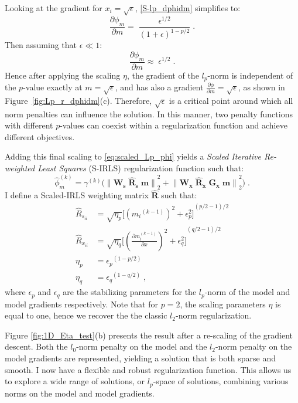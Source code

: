 Looking at the gradient for $x_i=\sqrt{\epsilon}$, \ref{S-lp_dphidm} simplifies to:
\begin{equation*}
\frac{\partial \phi_m}{\partial m} = \;\frac{\epsilon^{1/2}}{{(1+ \epsilon )}^{1-p/2}} \;.
\end{equation*}
Then assuming that $\epsilon \ll 1$:
\begin{equation} \label{approx_lp}
\frac{\partial \phi_m}{\partial m}\approx \; \epsilon^{1/2} \;.
\end{equation}
Hence after applying the scaling $\eta$, the gradient of the $l_p$-norm is independent of the $p$-value exactly at $m=\sqrt{\epsilon}$, and has also a gradient $\frac{\partial \phi}{\partial m}=\sqrt{\epsilon}$, as shown in Figure~\ref{fig:Lp_r_dphidm}(c).
Therefore, $\sqrt{\epsilon}$ is a critical point around which all norm penalties can influence the solution.
In this manner, two penalty functions with different $p$-values can coexist within a regularization function and achieve different objectives.
 
 Adding this final scaling to \ref{eq:scaled_Lp_phi} yields a \emph{Scaled Iterative Re-weighted Least Squares} (S-IRLS) regularization function such that: 
\begin{equation} \label{eq:S-IRLS}
\hat \phi_m^{(k)} = \gamma^{(k)} \Big ( {\| \mathbf{W_\text{s} \; \hat R_\text{s} \; m}\|}^2_2 +  {\|  \mathbf{ W_\text{x}\; \hat R_\text{x} \; G_\text{x} \; m}\|}^2_2  \Big ) \;.
 \end{equation}
I define a Scaled-IRLS weighting matrix $\mathbf{\hat R}$ such that:
\begin{equation} \label{eq:eta}
\begin{split}
{\hat R}_{s_{ii}}  &= \sqrt{\eta_p}{\Big[ {({m_i}^{(k-1)})}^{2} + \epsilon_p^2 \Big]}^{(p/2 - 1)/2} \\
{\hat R}_{x_{ii}}  &= \sqrt{\eta_q}{\Big[ {\left ({\frac{\partial m_i^{(k-1)} }{\partial x}}\right)}^{2} + \epsilon_q^2 \Big]}^{(q/2 - 1)/2}  \\
\eta_p &=  {\epsilon_p}^{(1-p/2)} \\
\eta_q &=   {\epsilon_q}^{(1-q/2)}  \;, 
\end{split}
\end{equation}
where $\epsilon_p$ and $\epsilon_q$ are the stabilizing parameters for the $l_p$-norm of the model and model gradients respectively.
Note that for $p=2$, the scaling parameters $\eta$ is equal to one, hence we recover the the classic $l_2$-norm regularization. 

 Figure \ref{fig:1D_Eta_test}(b) presents the result after a re-scaling of the gradient descent. 
Both the $l_0$-norm penalty on the model and the $l_2$-norm penalty on the model gradients are represented, yielding a solution that is both sparse and smooth. 
I now have a flexible and robust regularization function. This allows us to explore a wide range of solutions, or $l_p$-space of solutions, combining various norms on the model and model gradients.

